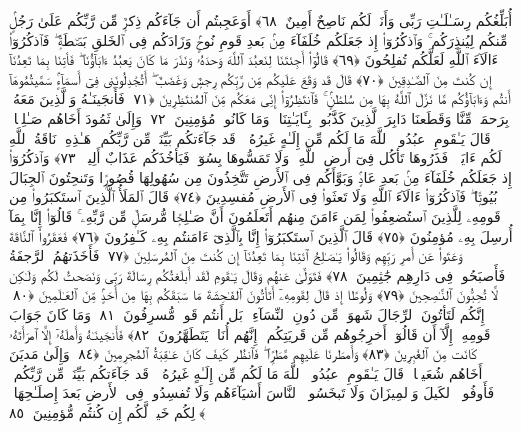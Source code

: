  أُبَلِّغُكُم رِسَـٰلَـٰتِ رَبِّى وَأَنَا۠ لَكُم نَاصِحٌ أَمِينٌ ﴿٦٨﴾
 أَوَعَجِبتُم أَن جَآءَكُم ذِكرٌۭ مِّن رَّبِّكُم عَلَىٰ رَجُلٍۢ مِّنكُم لِيُنذِرَكُم ۚ وَٱذكُرُوٓا۟ إِذ جَعَلَكُم خُلَفَآءَ مِنۢ بَعدِ قَومِ نُوحٍۢ وَزَادَكُم فِى ٱلخَلقِ بَصۜطَةًۭ ۖ فَٱذكُرُوٓا۟ ءَالَآءَ ٱللَّهِ لَعَلَّكُم تُفلِحُونَ ﴿٦٩﴾
 قَالُوٓا۟ أَجِئتَنَا لِنَعبُدَ ٱللَّهَ وَحدَهُۥ وَنَذَرَ مَا كَانَ يَعبُدُ ءَابَآؤُنَا ۖ فَأتِنَا بِمَا تَعِدُنَآ إِن كُنتَ مِنَ ٱلصَّـٰدِقِينَ ﴿٧٠﴾
 قَالَ قَد وَقَعَ عَلَيكُم مِّن رَّبِّكُم رِجسٌۭ وَغَضَبٌ ۖ أَتُجَٰدِلُونَنِى فِىٓ أَسمَآءٍۢ سَمَّيتُمُوهَآ أَنتُم وَءَابَآؤُكُم مَّا نَزَّلَ ٱللَّهُ بِهَا مِن سُلطَٰنٍۢ ۚ فَٱنتَظِرُوٓا۟ إِنِّى مَعَكُم مِّنَ ٱلمُنتَظِرِينَ ﴿٧١﴾
 فَأَنجَينَـٰهُ وَٱلَّذِينَ مَعَهُۥ بِرَحمَةٍۢ مِّنَّا وَقَطَعنَا دَابِرَ ٱلَّذِينَ كَذَّبُوا۟ بِـَٔايَـٰتِنَا ۖ وَمَا كَانُوا۟ مُؤمِنِينَ ﴿٧٢﴾
 وَإِلَىٰ ثَمُودَ أَخَاهُم صَـٰلِحًۭا ۗ قَالَ يَـٰقَومِ ٱعبُدُوا۟ ٱللَّهَ مَا لَكُم مِّن إِلَـٰهٍ غَيرُهُۥ ۖ قَد جَآءَتكُم بَيِّنَةٌۭ مِّن رَّبِّكُم ۖ هَـٰذِهِۦ نَاقَةُ ٱللَّهِ لَكُم ءَايَةًۭ ۖ فَذَرُوهَا تَأكُل فِىٓ أَرضِ ٱللَّهِ ۖ وَلَا تَمَسُّوهَا بِسُوٓءٍۢ فَيَأخُذَكُم عَذَابٌ أَلِيمٌۭ ﴿٧٣﴾
 وَٱذكُرُوٓا۟ إِذ جَعَلَكُم خُلَفَآءَ مِنۢ بَعدِ عَادٍۢ وَبَوَّأَكُم فِى ٱلأَرضِ تَتَّخِذُونَ مِن سُهُولِهَا قُصُورًۭا وَتَنحِتُونَ ٱلجِبَالَ بُيُوتًۭا ۖ فَٱذكُرُوٓا۟ ءَالَآءَ ٱللَّهِ وَلَا تَعثَوا۟ فِى ٱلأَرضِ مُفسِدِينَ ﴿٧٤﴾
 قَالَ ٱلمَلَأُ ٱلَّذِينَ ٱستَكبَرُوا۟ مِن قَومِهِۦ لِلَّذِينَ ٱستُضعِفُوا۟ لِمَن ءَامَنَ مِنهُم أَتَعلَمُونَ أَنَّ صَـٰلِحًۭا مُّرسَلٌۭ مِّن رَّبِّهِۦ ۚ قَالُوٓا۟ إِنَّا بِمَآ أُرسِلَ بِهِۦ مُؤمِنُونَ ﴿٧٥﴾
 قَالَ ٱلَّذِينَ ٱستَكبَرُوٓا۟ إِنَّا بِٱلَّذِىٓ ءَامَنتُم بِهِۦ كَـٰفِرُونَ ﴿٧٦﴾
 فَعَقَرُوا۟ ٱلنَّاقَةَ وَعَتَوا۟ عَن أَمرِ رَبِّهِم وَقَالُوا۟ يَـٰصَـٰلِحُ ٱئتِنَا بِمَا تَعِدُنَآ إِن كُنتَ مِنَ ٱلمُرسَلِينَ ﴿٧٧﴾
 فَأَخَذَتهُمُ ٱلرَّجفَةُ فَأَصبَحُوا۟ فِى دَارِهِم جَٰثِمِينَ ﴿٧٨﴾
 فَتَوَلَّىٰ عَنهُم وَقَالَ يَـٰقَومِ لَقَد أَبلَغتُكُم رِسَالَةَ رَبِّى وَنَصَحتُ لَكُم وَلَـٰكِن لَّا تُحِبُّونَ ٱلنَّـٰصِحِينَ ﴿٧٩﴾
 وَلُوطًا إِذ قَالَ لِقَومِهِۦٓ أَتَأتُونَ ٱلفَـٰحِشَةَ مَا سَبَقَكُم بِهَا مِن أَحَدٍۢ مِّنَ ٱلعَـٰلَمِينَ ﴿٨٠﴾
 إِنَّكُم لَتَأتُونَ ٱلرِّجَالَ شَهوَةًۭ مِّن دُونِ ٱلنِّسَآءِ ۚ بَل أَنتُم قَومٌۭ مُّسرِفُونَ ﴿٨١﴾
 وَمَا كَانَ جَوَابَ قَومِهِۦٓ إِلَّآ أَن قَالُوٓا۟ أَخرِجُوهُم مِّن قَريَتِكُم ۖ إِنَّهُم أُنَاسٌۭ يَتَطَهَّرُونَ ﴿٨٢﴾
 فَأَنجَينَـٰهُ وَأَهلَهُۥٓ إِلَّا ٱمرَأَتَهُۥ كَانَت مِنَ ٱلغَٰبِرِينَ ﴿٨٣﴾
 وَأَمطَرنَا عَلَيهِم مَّطَرًۭا ۖ فَٱنظُر كَيفَ كَانَ عَـٰقِبَةُ ٱلمُجرِمِينَ ﴿٨٤﴾
 وَإِلَىٰ مَديَنَ أَخَاهُم شُعَيبًۭا ۗ قَالَ يَـٰقَومِ ٱعبُدُوا۟ ٱللَّهَ مَا لَكُم مِّن إِلَـٰهٍ غَيرُهُۥ ۖ قَد جَآءَتكُم بَيِّنَةٌۭ مِّن رَّبِّكُم ۖ فَأَوفُوا۟ ٱلكَيلَ وَٱلمِيزَانَ وَلَا تَبخَسُوا۟ ٱلنَّاسَ أَشيَآءَهُم وَلَا تُفسِدُوا۟ فِى ٱلأَرضِ بَعدَ إِصلَـٰحِهَا ۚ ذَٟلِكُم خَيرٌۭ لَّكُم إِن كُنتُم مُّؤمِنِينَ ﴿٨٥﴾
